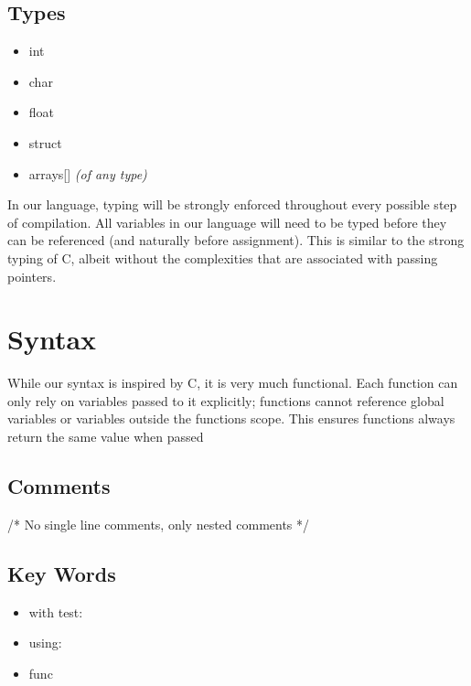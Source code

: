 \documentclass{article}
\begin{document}
\subsection{Types}
\begin{itemize}
	\item int
	\item char
	\item float
	\item struct
	\item arrays[] \textit{(of any type)}
\end{itemize}

In our language, typing will be strongly enforced throughout every possible step of compilation. All variables in our language will need to be typed before they can be referenced (and naturally before assignment). This is similar to the strong typing of C, albeit without the complexities that are associated with passing pointers.
\section{Syntax}
While our syntax is inspired by C, it is very much functional. Each function can only rely on variables passed to it explicitly; functions cannot reference global variables or variables outside the functions scope. This ensures functions always return the same value when passed 

\subsection{Comments}

/* No single line comments, only nested comments */

\subsection{Key Words}
\begin{itemize}
	\item
	with test: 
	\item
	using:
	\item 
	func
\end{itemize}

	
\end{document}
